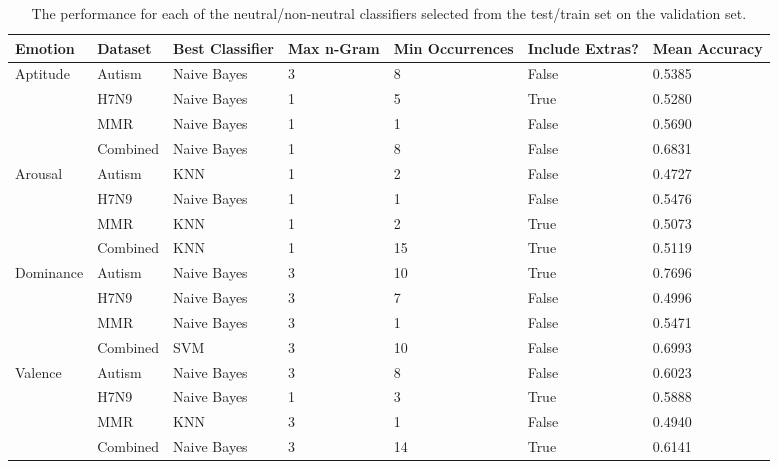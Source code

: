 \begin{table}[]
\centering
\begin{tabular}{|l|l|l|p{1.15cm}|p{1.4cm}|p{1.5cm}|p{1.25cm}|}
\hline
Emotion                    & Dataset  & Best Classifier & Max n-Gram & Min Occurrences & Include Extras? & Mean Accuracy \\ \hline
\multirow{4}{*}{Aptitude}  & Autism   & Naive Bayes     & 3          & 8               & False           & 0.5385  \\ \cline{2-7} 
                           & H7N9     & Naive Bayes     & 1          & 5               & True            & 0.5280  \\ \cline{2-7} 
                           & MMR      & Naive Bayes     & 1          & 1               & False           & 0.5690  \\ \cline{2-7} 
                           & Combined & Naive Bayes     & 1          & 8               & False           & 0.6831  \\ \hline
\multirow{4}{*}{Arousal}   & Autism   & KNN             & 1          & 2               & False           & 0.4727  \\ \cline{2-7} 
                           & H7N9     & Naive Bayes     & 1          & 1               & False           & 0.5476  \\ \cline{2-7} 
                           & MMR      & KNN             & 1          & 2               & True            & 0.5073  \\ \cline{2-7} 
                           & Combined & KNN             & 1          & 15              & True            & 0.5119  \\ \hline
\multirow{4}{*}{Dominance} & Autism   & Naive Bayes     & 3          & 10              & True            & 0.7696 \\ \cline{2-7} 
                           & H7N9     & Naive Bayes     & 3          & 7               & False           & 0.4996  \\ \cline{2-7} 
                           & MMR      & Naive Bayes     & 3          & 1               & False           & 0.5471  \\ \cline{2-7} 
                           & Combined & SVM             & 3          & 10              & False           & 0.6993  \\ \hline
\multirow{4}{*}{Valence}   & Autism   & Naive Bayes     & 3          & 8               & False           & 0.6023  \\ \cline{2-7} 
                           & H7N9     & Naive Bayes     & 1          & 3               & True            & 0.5888  \\ \cline{2-7} 
                           & MMR      & KNN             & 3          & 1               & False           & 0.4940   \\ \cline{2-7} 
                           & Combined & Naive Bayes     & 3          & 14              & True            & 0.6141  \\ \hline
\end{tabular}
\caption{The performance for each of the neutral/non-neutral classifiers selected from the test/train set on the validation set.}
\label{tab:emotionperformanceneutral}
\end{table}

